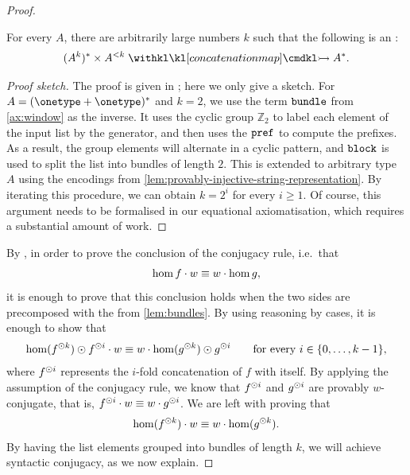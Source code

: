 \begin{proof}
\begin{lemma}
    \label{lem:bundles}
    For every  $A$, there are arbitrarily large numbers $k$ such that the following  is an :
    \begin{align*}
        (A^k)^* \times A^{< k} \concmap A^*.
    \end{align*}
\end{lemma}
\begin{proof}[Proof sketch]
    The proof is given in ; here we only give a sketch.  For $A = (\onetype + \onetype)^*$ and $k=2$, we use the term $\mathtt{bundle}$ from \cref{ax:window} as the inverse. It uses the cyclic group $\mathbb{Z}_2$ to label each element of the input list by the generator, and then uses the $\mathtt{pref}$  to compute the prefixes. As a result, the group elements will alternate in a cyclic pattern, and $\mathtt{block}$ is used to split the list into bundles of length $2$. This is extended to arbitrary type $A$ using the  encodings from \cref{lem:provably-injective-string-representation}. By iterating this procedure, we can obtain $k = 2^i$ for every $i \geq 1$. Of course, this argument needs to be formalised in our equational axiomatisation, which requires a substantial amount of work.
\end{proof}
By , in order to prove the conclusion of the conjugacy rule, i.e.~that
\begin{align*}
\hom f \cdot w \equiv w \cdot \hom g,
\end{align*}
it is enough to prove that this conclusion holds when the two sides are precomposed with the  from \cref{lem:bundles}. By using reasoning by cases, it is enough to show that
\begin{align*}
\hom(f^{\odot k}) \odot f^{\odot i} \cdot w \equiv w \cdot \hom(g^{\odot k}) \odot g^{\odot i}
\qquad \text{for every $i \in \{0,\ldots,k-1\}$,}
\end{align*}
where $f^{\odot i}$ represents the $i$-fold concatenation of $f$ with itself.
By applying the assumption of the conjugacy rule, we know that  $f^{\odot i}$ and $g^{\odot i}$ are provably $w$-conjugate, that is, $f^{\odot i} \cdot w \equiv w \cdot g^{\odot i}$. We
are left with proving that
\begin{align*}
\hom(f^{\odot k}) \cdot w \equiv w  \cdot \hom(g^{\odot k}).
\end{align*}
By having the list elements grouped into bundles of length $k$, we will achieve syntactic conjugacy, as we now explain.

\end{proof}
